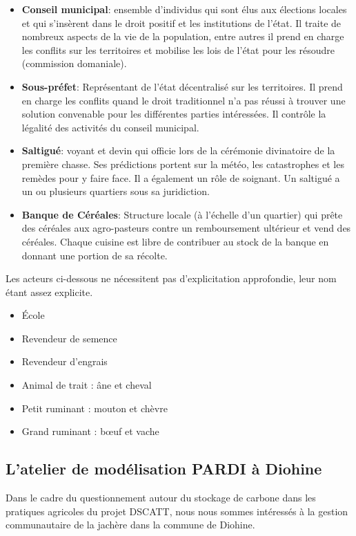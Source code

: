 \begin{itemize}
  \item \textbf{Conseil municipal}: ensemble d'individus qui sont élus aux élections locales et qui s'insèrent dans le droit positif et les institutions de l'état. Il traite de nombreux aspects de la vie de la population, entre autres il prend en charge les conflits sur les territoires et mobilise les lois de l'état pour les résoudre  (commission domaniale).
  \item \textbf{Sous-préfet}: Représentant de l'état décentralisé sur les territoires. Il prend en charge les conflits quand le droit traditionnel n'a pas réussi à trouver une solution convenable pour les différentes parties intéressées. Il contrôle la légalité des activités du conseil municipal.
  \item \textbf{Saltigué}: voyant et devin qui officie lors de la cérémonie divinatoire de la première chasse. Ses prédictions portent sur la météo, les catastrophes et les remèdes pour y faire face. Il a également un rôle de soignant. Un saltigué a un ou plusieurs quartiers sous sa juridiction.
  \item \textbf{Banque de Céréales}: Structure locale (à l'échelle d'un quartier) qui prête des céréales aux agro-pasteurs contre un remboursement ultérieur et vend des céréales. Chaque cuisine est libre de contribuer au stock de la banque en donnant une portion de sa récolte.
\end{itemize}



Les acteurs ci-dessous ne nécessitent pas d'explicitation approfondie, leur nom étant assez explicite.

\begin{itemize}
\item École
\item Revendeur de semence
\item Revendeur d'engrais
\item Animal de trait : âne et cheval
\item Petit ruminant : mouton et chèvre
\item Grand ruminant : bœuf et vache
\end{itemize}

\subsection{L'atelier de modélisation PARDI à Diohine }

Dans le cadre du questionnement autour du stockage de carbone dans les pratiques agricoles du projet DSCATT, nous nous sommes intéressés à la gestion communautaire de la jachère dans la commune de Diohine.

